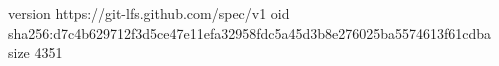 version https://git-lfs.github.com/spec/v1
oid sha256:d7c4b629712f3d5ce47e11efa32958fdc5a45d3b8e276025ba5574613f61cdba
size 4351
